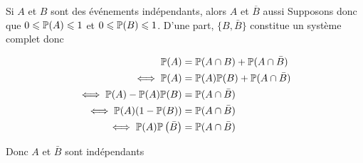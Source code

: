 \documentclass{article}
\begin{document}
\begin{question_kholle}{Si $A$ et $B$ sont des événements indépendants, alors $A$ et $\overline{B}$ aussi}
	Supposons donc que $0 \leqslant \mathbb P(A) \leqslant 1$ et $0 \leqslant \mathbb P(B) \leqslant 1$.
	D'une part, $\{ B, \bar{B} \}$ constitue un système complet donc
	
	\begin{align*}
		\mathbb P(A) &= \mathbb P(A \cap B) + \mathbb P(A \cap \bar{B}) \\
		\iff \mathbb P(A)&= \mathbb P(A) \mathbb P(B) + \mathbb P(A \cap \bar{B}) \\
		\iff \mathbb P(A) - \mathbb P(A) \mathbb P(B) &= \mathbb P(A \cap \bar{B}) \\
		\iff \mathbb P(A)(1-\mathbb P(B))&= \mathbb P(A \cap \bar{B}) \\
		\iff \mathbb P(A) \mathbb P\left(\bar{B}\right)&= \mathbb P(A \cap \bar{B})
	\end{align*}
	
	Donc $A$ et $\bar B$ sont indépendants
\end{question_kholle}
\end{document}
